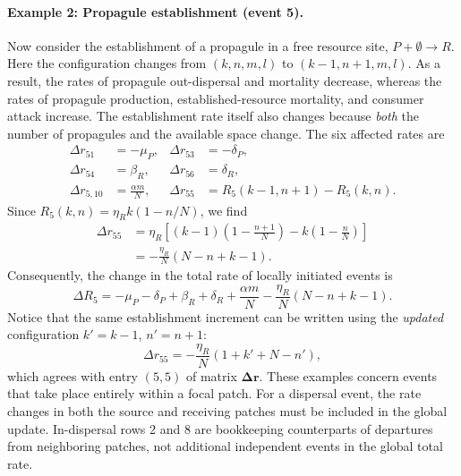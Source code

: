 \paragraph{Example 2: Propagule establishment (event 5).}
Now consider the establishment of a propagule in a free resource site,
$P+\emptyset\rightarrow R$. Here the configuration changes from
$(k,n,m,l)$ to $(k-1,n+1,m,l)$. As a result, the rates of propagule
out-dispersal and mortality decrease, whereas the rates of propagule
production, established-resource mortality, and consumer attack increase.
The establishment rate itself also changes because \emph{both} the number
of propagules and the available space change. The six affected rates are
\begin{align}
\Delta r_{51}&=-\mu_P, & \Delta r_{53}&=-\delta_P,\\
\Delta r_{54}&=\beta_R, & \Delta r_{56}&=\delta_R,\\
\Delta r_{5,10}&=\frac{\alpha m}{N}, &
\Delta r_{55}&=R_5(k-1,n+1)-R_5(k,n).
\end{align}
Since $R_5(k,n)=\eta_R k(1-n/N)$, we find
\begin{align}
\Delta r_{55}
&=\eta_R\left[(k-1)\left(1-\frac{n+1}{N}\right)
-k\left(1-\frac{n}{N}\right)\right]\\
&=-\frac{\eta_R}{N}(N-n+k-1).
\end{align}
Consequently, the change in the total rate of locally initiated events is
\begin{equation}
\boxed{
\Delta R_5=-\mu_P-\delta_P+\beta_R+\delta_R
+\frac{\alpha m}{N}
-\frac{\eta_R}{N}(N-n+k-1).}
\label{eq:delta_R_establishment}
\end{equation}
Notice that the same establishment increment can be written using the
\emph{updated} configuration $k'=k-1$, $n'=n+1$:
\begin{equation}
\Delta r_{55}=-\frac{\eta_R}{N}(1+k'+N-n'),
\end{equation}
which agrees with entry $(5,5)$ of matrix $\boldsymbol{\Delta r}$.
These examples concern events that take place entirely within a focal patch.
For a dispersal event, the rate changes in both the source and receiving
patches must be included in the global update. In-dispersal rows 2 and 8
are bookkeeping counterparts of departures from neighboring patches,
not additional independent events in the global total rate.

